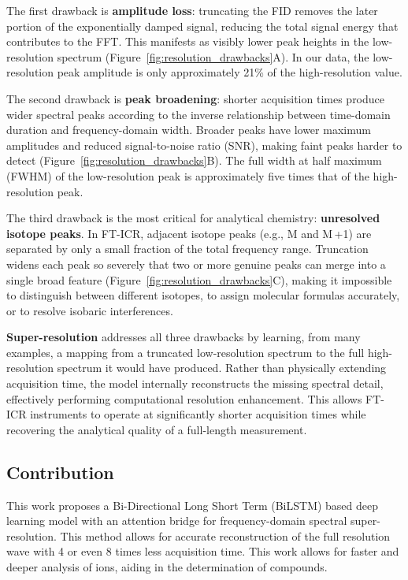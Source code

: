 \documentclass[12pt,a4paper]{report}
\begin{document}
The first drawback is \textbf{amplitude loss}: truncating the FID removes the later portion of the exponentially damped signal, reducing the total signal energy that contributes to the FFT. This manifests as visibly lower peak heights in the low-resolution spectrum (Figure~\ref{fig:resolution_drawbacks}A). In our data, the low-resolution peak amplitude is only approximately 21\% of the high-resolution value.

The second drawback is \textbf{peak broadening}: shorter acquisition times produce wider spectral peaks according to the inverse relationship between time-domain duration and frequency-domain width. Broader peaks have lower maximum amplitudes and reduced signal-to-noise ratio (SNR), making faint peaks harder to detect (Figure~\ref{fig:resolution_drawbacks}B). The full width at half maximum (FWHM) of the low-resolution peak is approximately five times that of the high-resolution peak.

The third drawback is the most critical for analytical chemistry: \textbf{unresolved isotope peaks}. In FT-ICR, adjacent isotope peaks (e.g., M and M\,+1) are separated by only a small fraction of the total frequency range. Truncation widens each peak so severely that two or more genuine peaks can merge into a single broad feature (Figure~\ref{fig:resolution_drawbacks}C), making it impossible to distinguish between different isotopes, to assign molecular formulas accurately, or to resolve isobaric interferences.

\textbf{Super-resolution} addresses all three drawbacks by learning, from many examples, a mapping from a truncated low-resolution spectrum to the full high-resolution spectrum it would have produced. Rather than physically extending acquisition time, the model internally reconstructs the missing spectral detail, effectively performing computational resolution enhancement. This allows FT-ICR instruments to operate at significantly shorter acquisition times while recovering the analytical quality of a full-length measurement.

\subsection{Contribution}
This work proposes a Bi-Directional\cite{bilstm} Long Short Term \cite{lstm}(BiLSTM) based deep learning model with an attention\cite{vaswani2017} bridge for frequency-domain spectral super-resolution. This method allows for accurate reconstruction of the full resolution wave with 4 or even 8 times less acquisition time. This work allows for faster and deeper analysis of ions, aiding in the determination of compounds.
\end{document}
